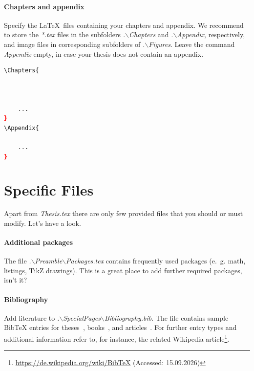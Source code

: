 \paragraph{Chapters and appendix} Specify the \LaTeX\ files containing your chapters and appendix. We recommend to store the \emph{*.tex} files in the subfolders \emph{.$\backslash$Chapters} and \emph{.$\backslash$Appendix}, respectively, and image files in corresponding subfolders of \emph{.$\backslash$Figures}. Leave the command \emph{Appendix} empty, in case your thesis does not contain an appendix.
%
\begin{lstlisting}[language=bash]
\Chapters{
	
	
	
	...
}
\Appendix{
	
	...
}
\end{lstlisting}

\section{Specific Files}

Apart from \emph{Thesis.tex} there are only few provided files that you should or must modify. Let's have a look.


\paragraph{Additional packages} The file \emph{.$\backslash$Preamble$\backslash$Packages.tex} contains frequently used packages (e.~g. math, listings, TikZ drawings). This is a great place to add further required packages, isn't it?


\paragraph{Bibliography} Add literature to \emph{.$\backslash$SpecialPages$\backslash$Bibliography.bib}. The file contains sample BibTeX entries for theses~\cite{Lassahn24}, books~\cite{Burger15,Chollet26}, and articles~\cite{HenselVogel25}. For further entry types and additional information refer to, for instance, the related Wikipedia article\footnote{\url{https://de.wikipedia.org/wiki/BibTeX} (Accessed: 15.09.2026)}.

